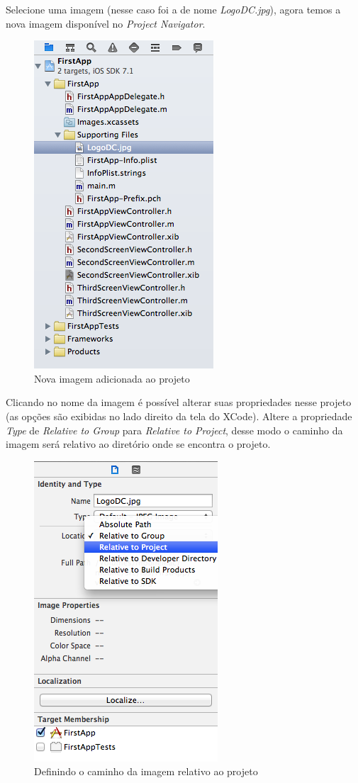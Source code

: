 \documentclass[a4paper,12pt,brazil,oneside]{book}
\begin{document}
Selecione uma imagem (nesse caso foi a de nome \emph{LogoDC.jpg}), agora temos a nova imagem disponível no \emph{Project Navigator}.

\begin{figure}[H]
  \centering
  \includegraphics[scale=0.6]{figuras/3/tela_novo_projeto_50.png}
  \caption{Nova imagem adicionada ao projeto}
  \label{fig:a}
\end{figure}


Clicando no nome da imagem é possível alterar suas propriedades nesse projeto (as opções são exibidas no lado direito da tela do XCode). Altere a propriedade \emph{Type} de \emph{Relative to Group} para \emph{Relative to Project}, desse modo o caminho da imagem será relativo ao diretório onde se encontra o projeto.

\begin{figure}[H]
  \centering
  \includegraphics[scale=0.6]{figuras/3/tela_novo_projeto_51.png}
  \caption{Definindo o caminho da imagem relativo ao projeto}
  \label{fig:a}
\end{figure}
\end{document}
